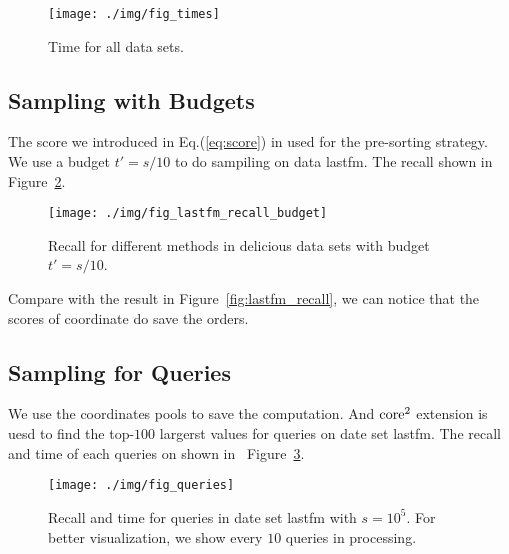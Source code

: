 \documentclass[letterpaper]{article}
\newcommand{\Eqn}[1]   {Eq.(\ref{eq:#1})}
\newcommand{\Fig}[1]   {Figure~\ref{fig:#1}}
\begin{document}
\begin{figure}[H]
  \centering
  \texttt{[image: ./img/fig\_times]}\\
  \caption{Time for all data sets.}
  \label{fig:times}
\end{figure}
\subsection{Sampling with Budgets}
The score we introduced in \Eqn{score} in used for the pre-sorting strategy.
We use a budget $t' = s/10$ to do sampiling on data lastfm.
The recall shown in \Fig{budget}.
\begin{figure}[ht]
  \centering
  \texttt{[image: ./img/fig\_lastfm\_recall\_budget]}\\
  \caption{Recall for different methods in delicious data sets with budget $t'=s/10$.}
  \label{fig:budget}
\end{figure}
Compare with the result in \Fig{lastfm_recall}, we can notice that the scores of coordinate
do save the orders.
\subsection{Sampling for Queries}
We use the coordinates pools to save the computation.
And ${\rm core}^2$ extension is uesd 
to find the top-$100$ largerst values for queries on date set lastfm.
The recall and time of each queries on shown in ~\Fig{Queries}.
\begin{figure}[ht]
  \centering
  \texttt{[image: ./img/fig\_queries]}\\
  \caption{Recall and time for queries in date set lastfm with $s=10^5$.
           For better visualization,
           we show every $10$ queries in processing.}
  \label{fig:Queries}
\end{figure}
\end{document}
